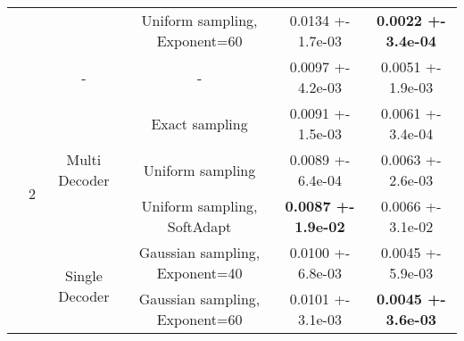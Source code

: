\begin{tabular}{||c|c|c|c|c|c||}
\cline{4-6}
 &  &  & Uniform sampling, Exponent=60 & 0.0134 +- 1.7e-03 & \textbf{0.0022 +- 3.4e-04} \\
\cline{4-6}
\cline{3-6}
\cline{2-6}
 & \multirow{6}{*}{2} & \multirow{1}{*}{-} & - & 0.0097 +- 4.2e-03 & 0.0051 +- 1.9e-03 \\
\cline{4-6}
\cline{3-6}
 &  & \multirow{3}{*}{Multi Decoder} & Exact sampling & 0.0091 +- 1.5e-03 & 0.0061 +- 3.4e-04 \\
\cline{4-6}
 &  &  & Uniform sampling & 0.0089 +- 6.4e-04 & 0.0063 +- 2.6e-03 \\
\cline{4-6}
 &  &  & Uniform sampling, SoftAdapt & \textbf{0.0087 +- 1.9e-02} & 0.0066 +- 3.1e-02 \\
\cline{4-6}
\cline{3-6}
 &  & \multirow{2}{*}{Single Decoder} & Gaussian sampling, Exponent=40 & 0.0100 +- 6.8e-03 & 0.0045 +- 5.9e-03 \\
\cline{4-6}
 &  &  & Gaussian sampling, Exponent=60 & 0.0101 +- 3.1e-03 & \textbf{0.0045 +- 3.6e-03} \\
\cline{4-6}
\cline{3-6}
\cline{2-6}
\hline
\hline
\end{tabular}
